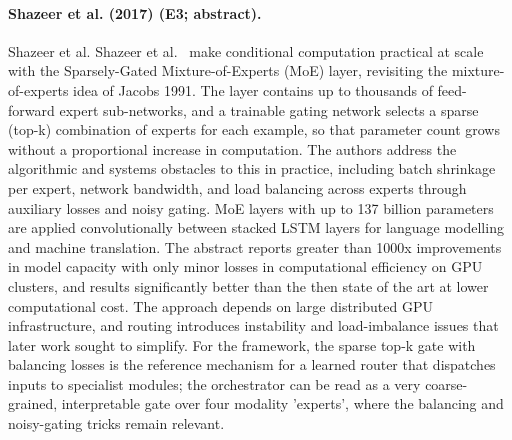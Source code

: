 \documentclass[10pt,a4paper]{article}
\begin{document}
\paragraph{Shazeer et al. (2017) (E3; abstract).} Shazeer et al. Shazeer et al.~\cite{Shazeer2017} make conditional computation practical at scale with the Sparsely-Gated Mixture-of-Experts (MoE) layer, revisiting the mixture-of-experts idea of Jacobs 1991. The layer contains up to thousands of feed-forward expert sub-networks, and a trainable gating network selects a sparse (top-k) combination of experts for each example, so that parameter count grows without a proportional increase in computation. The authors address the algorithmic and systems obstacles to this in practice, including batch shrinkage per expert, network bandwidth, and load balancing across experts through auxiliary losses and noisy gating. MoE layers with up to 137 billion parameters are applied convolutionally between stacked LSTM layers for language modelling and machine translation. The abstract reports greater than 1000x improvements in model capacity with only minor losses in computational efficiency on GPU clusters, and results significantly better than the then state of the art at lower computational cost. The approach depends on large distributed GPU infrastructure, and routing introduces instability and load-imbalance issues that later work sought to simplify. For the framework, the sparse top-k gate with balancing losses is the reference mechanism for a learned router that dispatches inputs to specialist modules; the orchestrator can be read as a very coarse-grained, interpretable gate over four modality 'experts', where the balancing and noisy-gating tricks remain relevant.
\end{document}
